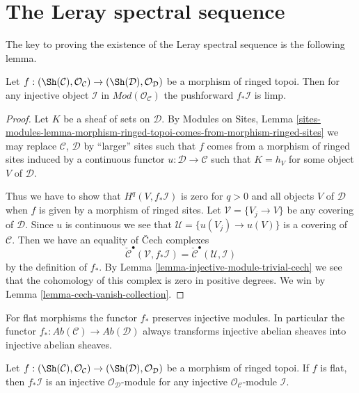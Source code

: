 \section{The Leray spectral sequence}
\label{section-leray}

\noindent
The key to proving the existence of the Leray spectral sequence is
the following lemma.

\begin{lemma}
\label{lemma-direct-image-injective-sheaf}
Let $f : (\Sh(\mathcal{C}), \mathcal{O}_\mathcal{C}) \to
(\Sh(\mathcal{D}), \mathcal{O}_\mathcal{D})$ be a morphism of ringed topoi.
Then for any injective object $\mathcal{I}$ in
$\textit{Mod}(\mathcal{O}_\mathcal{C})$
the pushforward $f_*\mathcal{I}$ is limp.
\end{lemma}

\begin{proof}
Let $K$ be a sheaf of sets on $\mathcal{D}$.
By
Modules on Sites, Lemma
\ref{sites-modules-lemma-morphism-ringed-topoi-comes-from-morphism-ringed-sites}
we may replace $\mathcal{C}$, $\mathcal{D}$ by ``larger'' sites such
that $f$ comes from a morphism of ringed sites induced by a continuous
functor $u : \mathcal{D} \to \mathcal{C}$ such that
$K = h_V$ for some object $V$ of $\mathcal{D}$.

\medskip\noindent
Thus we have to show that $H^q(V, f_*\mathcal{I})$ is zero
for $q > 0$ and all objects $V$ of $\mathcal{D}$ when $f$ is given
by a morphism of ringed sites. Let $\mathcal{V} = \{V_j \to V\}$
be any covering of $\mathcal{D}$. Since $u$ is continuous we see that
$\mathcal{U} = \{u(V_j) \to u(V)\}$ is a covering of $\mathcal{C}$.
Then we have an equality of {\v C}ech complexes
$$
\check{\mathcal{C}}^\bullet(\mathcal{V}, f_*\mathcal{I})
=
\check{\mathcal{C}}^\bullet(\mathcal{U}, \mathcal{I})
$$
by the definition of $f_*$. By
Lemma \ref{lemma-injective-module-trivial-cech}
we see that the cohomology of this complex is zero in positive degrees.
We win by
Lemma \ref{lemma-cech-vanish-collection}.
\end{proof}

\noindent
For flat morphisms the functor $f_*$ preserves injective modules.
In particular the functor
$f_* : \textit{Ab}(\mathcal{C}) \to \textit{Ab}(\mathcal{D})$ always
 transforms injective
abelian sheaves into injective abelian sheaves.

\begin{lemma}
\label{lemma-pushforward-injective-flat}
Let $f : (\Sh(\mathcal{C}), \mathcal{O}_\mathcal{C}) \to
(\Sh(\mathcal{D}), \mathcal{O}_\mathcal{D})$ be a morphism of ringed topoi.
If $f$ is flat, then $f_*\mathcal{I}$ is an injective
$\mathcal{O}_\mathcal{D}$-module
for any injective $\mathcal{O}_\mathcal{C}$-module $\mathcal{I}$.
\end{lemma}


